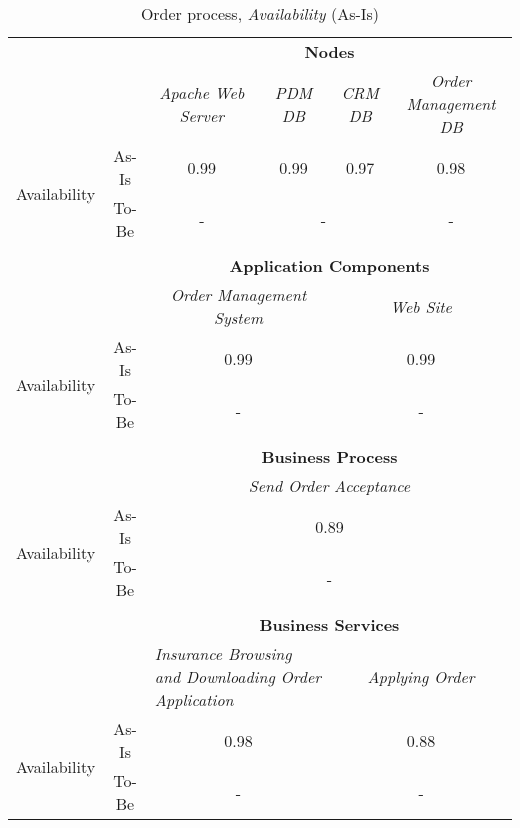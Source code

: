 \begin{table}[H]
	\centering
	\begin{tabular}{|c|c|p{2cm}|p{2.5cm}|p{2.5cm}|p{2.5cm}|}
		\cline{3-6}

		\multicolumn{2}{c}{} & \multicolumn{4}{|c|}{\textbf{Nodes}} \\ \cline{3-6}
		\multicolumn{2}{c|}{} & \multicolumn{1}{c|}{\textsl{Apache Web Server}} & \multicolumn{1}{c|}{\textsl{PDM DB}} & \multicolumn{1}{c|}{\textsl{CRM DB}} & \multicolumn{1}{c|}{\textsl{Order Management DB}}\\
		\hline
		\multirow{2}{*}{Availability} & As-Is & \multicolumn{1}{c|}{0.99} & \multicolumn{1}{c|}{0.99} & \multicolumn{1}{c|}{0.97} & \multicolumn{1}{c|}{0.98}\\ \cline{2-6}
										& To-Be &\multicolumn{1}{c|}{-} & \multicolumn{2}{c|}{-} & \multicolumn{1}{c|}{-}\\ \hline

		\multicolumn{6}{c}{} \\ \cline{3-6}							
		\multicolumn{2}{c}{} & \multicolumn{4}{|c|}{\textbf{Application Components}} \\ \cline{3-6}
		\multicolumn{2}{c|}{} & \multicolumn{2}{c|}{\textsl{Order Management System}} & \multicolumn{2}{c|}{\textsl{Web Site}}\\
		\hline
		\multirow{2}{*}{Availability} & As-Is & \multicolumn{2}{c|}{0.99} & \multicolumn{2}{c|}{0.99}\\ \cline{2-6}
										& To-Be &\multicolumn{2}{c|}{-} & \multicolumn{2}{c|}{-}\\ \hline

		\multicolumn{6}{c}{} \\ \cline{3-6}
		\multicolumn{2}{c}{} & \multicolumn{4}{|c|}{\textbf{Business Process}} \\ \cline{3-6}
		\multicolumn{2}{c|}{} & \multicolumn{4}{|c|}{\textsl{Send Order Acceptance}}\\ \hline
		\multirow{2}{*}{Availability} & As-Is & \multicolumn{4}{|c|}{0.89}\\ \cline{2-6}
									   & To-Be & \multicolumn{4}{|c|}{-}\\ \hline
		\multicolumn{6}{c}{} \\ \cline{3-6}
		\multicolumn{2}{c}{} & \multicolumn{4}{|c|}{\textbf{Business Services}} \\ \cline{3-6}

		\multicolumn{2}{c|}{} & \multicolumn{2}{|p{5cm}|}{\textsl{Insurance Browsing and Downloading Order Application}} & \multicolumn{2}{|c|}{\textsl{Applying Order}} \\ \hline
		\multirow{2}{*}{Availability} & As-Is & \multicolumn{2}{|c|}{0.98} & \multicolumn{2}{|c|}{0.88}\\ \cline{2-6}
									   & To-Be & \multicolumn{2}{|c|}{-} & \multicolumn{2}{|c|}{-}\\ \hline
	\end{tabular}
\caption{Order process, \textsl{Availability} (As-Is)} 
\label{tab:order_as_is}
\end{table}
